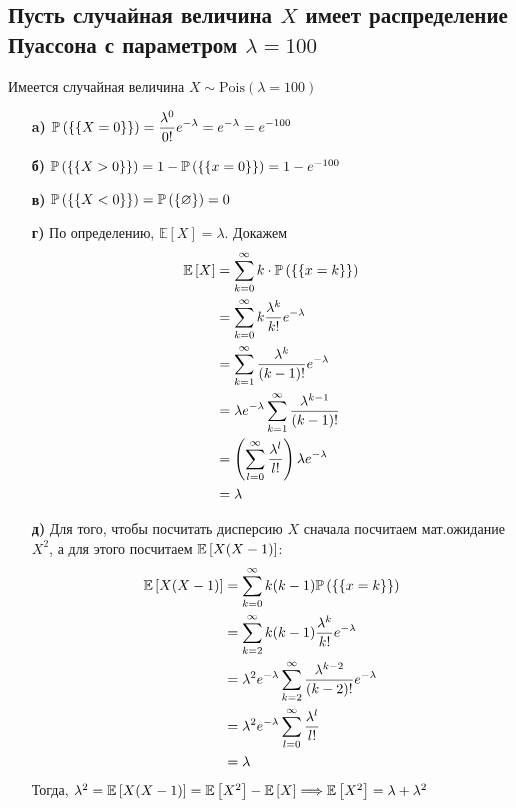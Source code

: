 \documentclass{article}
\begin{document}
\subsection{Пусть случайная величина $X$ имеет распределение Пуассона с параметром $\lambda= 100$}
Имеется случайная величина $X\sim\text{Pois}(\lambda=100)$
\begin{enumerate}
    \item[\textbf{a)}] $\mathbb{P}\left(\{\{X=0\}\}\right)=\displaystyle\frac{\lambda^0}{0!}e^{-\lambda}=e^{-\lambda}=e^{-100}$
    \item[\textbf{б)}] $\mathbb{P}\left(\{\{X>0\}\}\right)=1-\mathbb{P}\left(\{\{x=0\}\}\right)=1-e^{-100}$
    \item[\textbf{в)}] $\mathbb{P}\left(\{\{X<0\}\}\right)=\mathbb{P}\left(\{\varnothing\}\right)=0$
    \item[\textbf{г)}] По определению, $\mathbb{E}\left[X\right]=\lambda$. Докажем
    \begin{equation*}
        \begin{aligned}
            \matwait{X}&=\sum_{k=0}^{\infty} k\cdot\prob{\{x=k\}}\\
            &=\sum_{k=0}^{\infty} k\frac{\lambda^k}{k!}e^{-\lambda}\\
            &=\sum_{k=1}^{\infty} \frac{\lambda^k}{(k-1)!}e^{-\lambda}\\
            &=\lambda e^{-\lambda}\sum_{k=1}^{\infty}\frac{\lambda^{k-1}}{(k-1)!}\\
            &=\left(\sum_{l=0}^{\infty}\frac{\lambda^l}{l!}\right)\lambda e^{-\lambda}\\
            &=\lambda
        \end{aligned}
    \end{equation*}
    \item[\textbf{д)}] Для того, чтобы посчитать дисперсию $X$ сначала посчитаем мат.ожидание $X^2$, а для этого посчитаем $\mathbb{E}\left[X(X-1)\right]$:
    \begin{equation*}
        \begin{aligned}
            \matwait{X(X-1)}&=\sum_{k=0}^{\infty} k(k-1)\prob{\{x=k\}}\\
            &=\sum_{k=2}^{\infty} k(k-1)\frac{\lambda^k}{k!}e^{-\lambda}\\
            &=\lambda^2e^{-\lambda}\sum_{k=2}^{\infty}\frac{\lambda^{k-2}}{(k-2)!}e^{-\lambda}\\
            &=\lambda^2e^{-\lambda}\sum_{l=0}^{\infty}\frac{\lambda^{l}}{l!}\\
            &=\lambda
        \end{aligned}
    \end{equation*}
    Тогда, $\lambda^2=\mathbb{E}\left[X(X-1)\right]=\mathbb{E}\left[X^2\right]-\mathbb{E}\left[X\right]\Longrightarrow\mathbb{E}\left[X^2\right]=\lambda+\lambda^2$
    

\end{enumerate}
\end{document}
